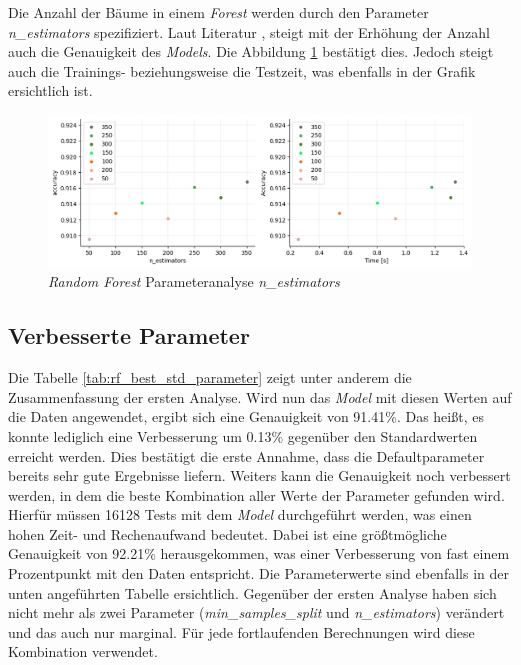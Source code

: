 Die Anzahl der Bäume in einem \textit{Forest} werden durch den Parameter \textit{n\_estimators} spezifiziert. Laut Literatur \cite{Rebala2019}, steigt mit der Erhöhung der Anzahl auch die Genauigkeit des \textit{Models}. Die Abbildung \ref{fig:rf_n_estimators} bestätigt dies. Jedoch steigt auch die Trainings- beziehungsweise die Testzeit, was ebenfalls in der Grafik ersichtlich ist.

\begin{figure}[htbp]
	\centering
	\includegraphics[width=\textwidth]{images/n_estimators.png}
	\caption{\textit{Random Forest} Parameteranalyse \textit{n\_estimators}}
	\label{fig:rf_n_estimators}
\end{figure}

\subsection{Verbesserte Parameter}

Die Tabelle \ref{tab:rf_best_std_parameter} zeigt unter anderem die Zusammenfassung der ersten Analyse. Wird nun das \textit{Model} mit diesen Werten auf die Daten angewendet, ergibt sich eine Genauigkeit von 91.41\%. Das heißt, es konnte lediglich eine Verbesserung um 0.13\% gegenüber den Standardwerten erreicht werden. Dies bestätigt die erste Annahme, dass die Defaultparameter bereits sehr gute Ergebnisse liefern. Weiters kann die Genauigkeit noch verbessert werden, in dem die beste Kombination aller Werte der Parameter gefunden wird. Hierfür müssen 16128 Tests mit dem \textit{Model} durchgeführt werden, was einen hohen Zeit- und Rechenaufwand bedeutet. Dabei ist eine größtmögliche Genauigkeit von 92.21\% herausgekommen, was einer Verbesserung von fast einem Prozentpunkt mit den Daten entspricht. Die Parameterwerte sind ebenfalls in der unten angeführten Tabelle ersichtlich. Gegenüber der ersten Analyse haben sich nicht mehr als zwei Parameter (\textit{min\_samples\_split} und \textit{n\_estimators}) verändert und das auch nur marginal. Für jede fortlaufenden Berechnungen wird diese Kombination verwendet.

